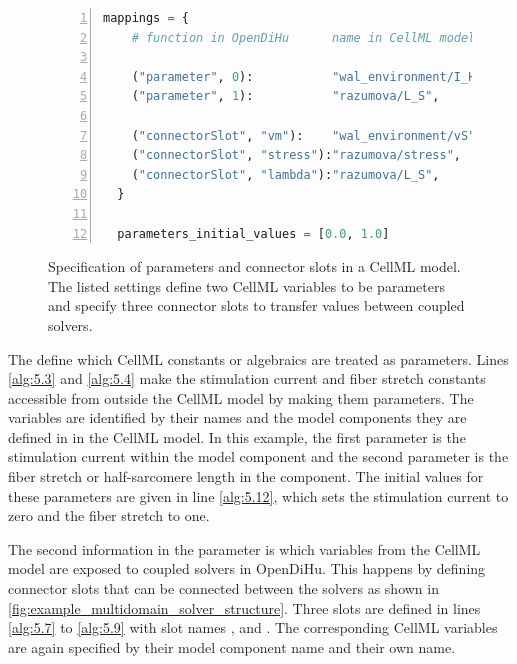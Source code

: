 \begin{figure}
\centering
\begin{framed}
\begin{lstlisting}[basicstyle=\small\ttfamily,commentstyle=\color{gray},numbers=left,language=python]
  mappings = {
    # function in OpenDiHu      name in CellML model    # comment
    
    ("parameter", 0):           "wal_environment/I_HH", # I_stim (constant)   $\label{alg:5.3}$
    ("parameter", 1):           "razumova/L_S",         # $\textcolor{gray}{\lambda}$ (constant)      $\label{alg:5.4}$
    
    ("connectorSlot", "vm"):    "wal_environment/vS",   # $\textcolor{gray}{V_m}$ (state)            $\label{alg:5.7}$
    ("connectorSlot", "stress"):"razumova/stress",      # $\textcolor{gray}{\gamma}$ (algebraic) $\label{alg:5.8}$
    ("connectorSlot", "lambda"):"razumova/L_S",         # $\textcolor{gray}{\lambda}$ (constant)        $\label{alg:5.9}$
  }
  
  parameters_initial_values = [0.0, 1.0]                # I_stim=0, $\textcolor{gray}{\lambda}$=1                    $\label{alg:5.12}$
\end{lstlisting}
\end{framed}
\caption{Specification of parameters and connector slots in a CellML model. The listed settings define two CellML variables to be parameters and specify three connector slots to transfer values between coupled solvers.}%
\label{fig:example_mapping}%
\end{figure}

The  define which CellML constants or algebraics are treated as parameters. Lines \ref{alg:5.3} and \ref{alg:5.4} make the stimulation current and fiber stretch constants accessible from outside the CellML model by making them parameters. The variables are identified by their names and the model components they are defined in in the CellML model. In this example, the first parameter is the stimulation current  within the  model component and the second parameter is the fiber stretch or half-sarcomere length  in the  component.
The initial values for these parameters are given in line \ref{alg:5.12}, which sets the stimulation current to zero and the fiber stretch to one.

The second information in the  parameter is which variables from the CellML model are exposed to coupled solvers in OpenDiHu. This happens by defining connector slots that can be connected between the solvers as shown in \cref{fig:example_multidomain_solver_structure}.
Three slots are defined in lines \ref{alg:5.7} to \ref{alg:5.9} with slot names ,  and . The corresponding CellML variables are again specified by their model component name and their own name. 

